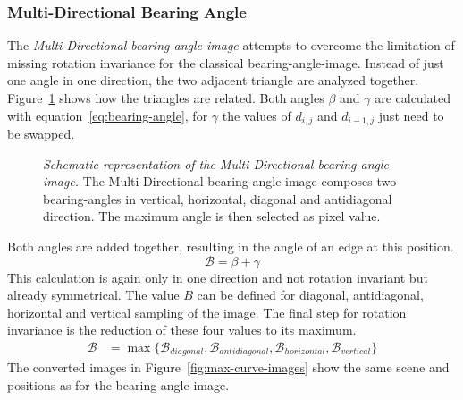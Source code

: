 \subsubsection{Multi-Directional Bearing Angle}

The \emph{Multi-Directional \gls{bearing-angle-image}} attempts to overcome the limitation of missing rotation invariance for the classical \gls{bearing-angle-image}.
Instead of just one angle in one direction, the two adjacent triangle are analyzed together.
Figure~\ref{fig:max-curve} shows how the triangles are related.
Both angles $\beta$ and $\gamma$ are calculated with equation~\ref{eq:bearing-angle}, for $\gamma$ the values of $d_{i,j}$ and $d_{i-1,j}$ just need to be swapped.
\begin{figure}
    \scalebox{0.9}{%
    
    }
    \caption[Schematic representation of the Multi-Directional \gls{bearing-angle-image}]{\emph{Schematic representation of the Multi-Directional \gls{bearing-angle-image}.} The Multi-Directional \gls{bearing-angle-image} composes two \Glspl{bearing-angle} in vertical, horizontal, diagonal and antidiagonal direction. The maximum angle is then selected as pixel value.}\label{fig:max-curve}
\end{figure}
Both angles are added together, resulting in the angle of an edge at this position.
\begin{equation}
    \mathcal{B} = \beta + \gamma
\end{equation}
This calculation is again only in one direction and not rotation invariant but already symmetrical.
The value $B$ can be defined for diagonal, antidiagonal, horizontal and vertical sampling of the image.
The final step for rotation invariance is the reduction of these four values to its maximum.
\begin{align}
    \mathcal{B} &= \max{\{\mathcal{B}_{diagonal}, \mathcal{B}_{antidiagonal}, \mathcal{B}_{horizontal}, \mathcal{B}_{vertical}\}}
\end{align}
The converted images in Figure~\ref{fig:max-curve-images} show the same scene and positions as for the \gls{bearing-angle-image}.
